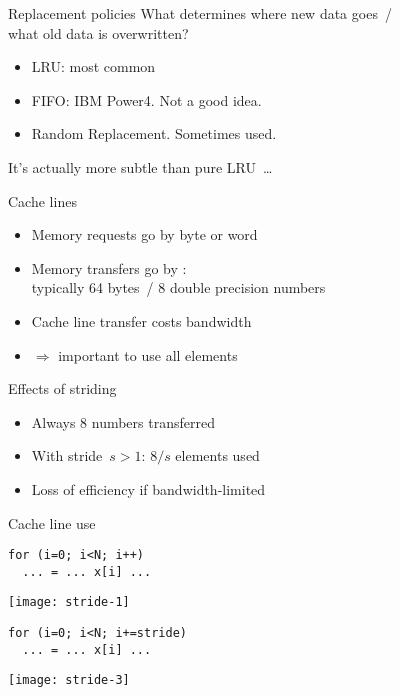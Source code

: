 \begin{numberedframe}{Replacement policies}
  What determines where new data goes~/\\
  what old data is overwritten?

  \begin{itemize}
  \item \acf{LRU}: most common
  \item \acf{FIFO}: IBM Power4. Not a good idea.
  \item Random Replacement. Sometimes used.
  \end{itemize}

  It's actually more subtle than pure \ac{LRU}~\ldots
\end{numberedframe}

\begin{numberedframe}{Cache lines}
  \begin{itemize}
  \item Memory requests go by byte or word
  \item Memory transfers go by :\\
    typically 64 bytes~/ 8 double precision numbers
  \item Cache line transfer costs bandwidth
  \item $\Rightarrow$ important to use all elements
  \end{itemize}
\end{numberedframe}

\begin{numberedframe}{Effects of striding}
  \begin{itemize}
  \item Always 8 numbers transferred
  \item With stride~$s>1$: $8/s$ elements used
  \item Loss of efficiency if bandwidth-limited
  \end{itemize}
\end{numberedframe}

\begin{numberedframe}{Cache line use}
\begin{verbatim}
for (i=0; i<N; i++)
  ... = ... x[i] ...
\end{verbatim}
  \texttt{[image: stride-1]}
\begin{verbatim}
for (i=0; i<N; i+=stride)
  ... = ... x[i] ...
\end{verbatim}
  \texttt{[image: stride-3]}
\end{numberedframe}

